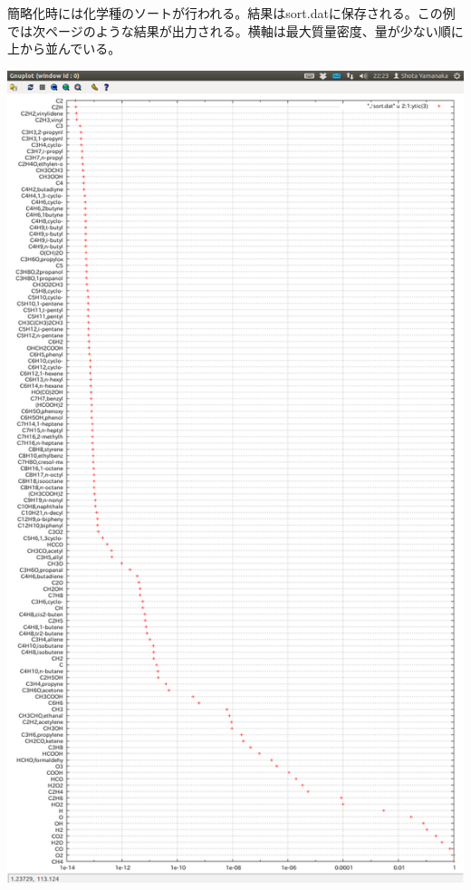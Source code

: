 \documentclass{jsarticle}
\begin{document}
\hspace{1em}

簡略化時には化学種のソートが行われる。結果はsort.datに保存される。この例では次ページのような結果が出力される。横軸は最大質量密度、量が少ない順に上から並んでいる。
\begin{center}
\includegraphics[height=\textheight,bb=0 0 1080 1918]{sample/no16.png}
\end{center}
\end{document}
